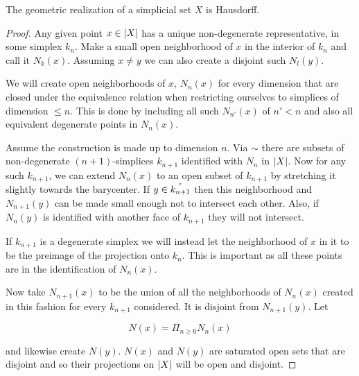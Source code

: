 \documentclass[../../main.tex]{subfiles}
\begin{document}
    \begin{proposition}
        The geometric realization of a simplicial set $X$ is Hausdorff.
    \end{proposition}

    \begin{proof}
        Any given point $x \in \geom[X]$ has a unique non-degenerate representative, in some simplex $k_n$. Make a small open neighborhood of $x$ in the interior of $k_n$ and call it $N_k(x)$. Assuming $x \neq y$ we can also create a disjoint such $N_l(y)$.
        
        We will create open neighborhoods of $x$, $N_n(x)$ for every dimension that are closed under the equivalence relation when restricting ourselves to simplices of dimension $\leq n$. This is done by including all such $N_{n'}(x)$ of $n' < n$ and also all equivalent degenerate points in $N_n(x)$.
        
        Assume the construction is made up to dimension $n$. Via $\sim$ there are subsets of non-degenerate $(n+1)$-simplices $k_{n+1}$ identified with $N_n$ in $\geom[X]$. Now for any such $k_{n+1}$, we can extend $N_n(x)$ to an open subset of $k_{n+1}$ by stretching it slightly towards the barycenter. If $y \in \interior{k_{n+1}}$ then this neighborhood and $N_{n+1}(y)$ can be made small enough not to intersect each other. Also, if $N_{n}(y)$ is identified with another face of $k_{n+1}$ they will not intersect.

        If $k_{n+1}$ is a degenerate simplex we will instead let the neighborhood of $x$ in it to be the preimage of the projection onto $k_n$. This is important as all these points are in the identification of $N_n(x)$.

        Now take $N_{n+1}(x)$ to be the union of all the neighborhoods of $N_n(x)$ created in this fashion for every $k_{n+1}$ considered. It is disjoint from $N_{n+1}(y)$. Let

        \begin{equation*}
            N(x) = \Pi_{n \geq 0} N_n(x)
        \end{equation*}

        and likewise create $N(y)$. $N(x)$ and $N(y)$ are saturated open sets that are disjoint and so their projections on $\geom[X]$ will be open and disjoint.
    \end{proof}
    
\end{document}
